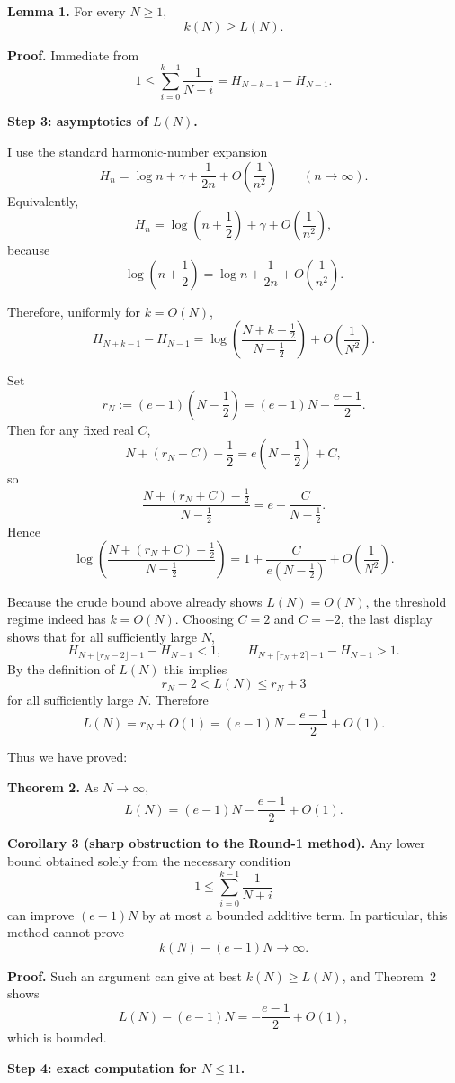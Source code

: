 \medskip
\noindent\textbf{Lemma 1.}
For every $N\ge 1$,
\[
k(N)\ge L(N).
\]

\medskip
\noindent\textbf{Proof.}
Immediate from
\[
1\le \sum_{i=0}^{k-1}\frac1{N+i}=H_{N+k-1}-H_{N-1}.
\]

\medskip
\noindent\textbf{Step 3: asymptotics of $L(N)$.}

I use the standard harmonic-number expansion
\[
H_n=\log n+\gamma+\frac1{2n}+O\!\left(\frac1{n^2}\right)
\qquad (n\to\infty).
\]
Equivalently,
\[
H_n=\log\!\left(n+\frac12\right)+\gamma+O\!\left(\frac1{n^2}\right),
\]
because
\[
\log\!\left(n+\frac12\right)=\log n+\frac1{2n}+O\!\left(\frac1{n^2}\right).
\]

Therefore, uniformly for $k=O(N)$,
\[
H_{N+k-1}-H_{N-1}
=
\log\!\left(\frac{N+k-\frac12}{\,N-\frac12\,}\right)
+
O\!\left(\frac1{N^2}\right).
\]

Set
\[
r_N:=(e-1)\left(N-\frac12\right)=(e-1)N-\frac{e-1}{2}.
\]
Then for any fixed real $C$,
\[
N+(r_N+C)-\frac12=e\left(N-\frac12\right)+C,
\]
so
\[
\frac{N+(r_N+C)-\frac12}{N-\frac12}
=
e+\frac{C}{N-\frac12}.
\]
Hence
\[
\log\!\left(\frac{N+(r_N+C)-\frac12}{N-\frac12}\right)
=
1+\frac{C}{e(N-\frac12)}+O\!\left(\frac1{N^2}\right).
\]

Because the crude bound above already shows $L(N)=O(N)$, the threshold regime indeed has $k=O(N)$. Choosing $C=2$ and $C=-2$, the last display shows that for all sufficiently large $N$,
\[
H_{N+\lfloor r_N-2\rfloor-1}-H_{N-1}<1,
\qquad
H_{N+\lceil r_N+2\rceil-1}-H_{N-1}>1.
\]
By the definition of $L(N)$ this implies
\[
r_N-2 < L(N) \le r_N+3
\]
for all sufficiently large $N$. Therefore
\[
L(N)=r_N+O(1)=(e-1)N-\frac{e-1}{2}+O(1).
\]

Thus we have proved:

\medskip
\noindent\textbf{Theorem 2.}
As $N\to\infty$,
\[
L(N)=(e-1)N-\frac{e-1}{2}+O(1).
\]

\medskip
\noindent\textbf{Corollary 3 (sharp obstruction to the Round-1 method).}
Any lower bound obtained solely from the necessary condition
\[
1\le \sum_{i=0}^{k-1}\frac1{N+i}
\]
can improve $(e-1)N$ by at most a bounded additive term. In particular, this method cannot prove
\[
k(N)-(e-1)N\to\infty.
\]

\medskip
\noindent\textbf{Proof.}
Such an argument can give at best $k(N)\ge L(N)$, and Theorem~2 shows
\[
L(N)-(e-1)N=-\frac{e-1}{2}+O(1),
\]
which is bounded.

\medskip
\noindent\textbf{Step 4: exact computation for $N\le 11$.}

